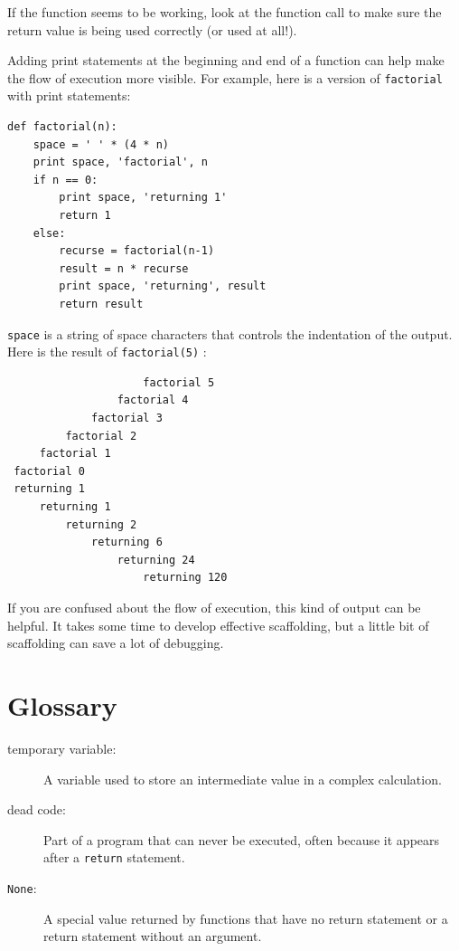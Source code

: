 \documentclass[10pt]{book}
\begin{document}
\begin{CJK}{UTF8}{gbsn}
If the function seems to be working, look at the function call
to make sure the return value is being used correctly (or used
at all!).

Adding print statements at the beginning and end of a function
can help make the flow of execution more visible.
For example, here is a version of {\tt factorial} with
print statements:

\begin{verbatim}
def factorial(n):
    space = ' ' * (4 * n)
    print space, 'factorial', n
    if n == 0:
        print space, 'returning 1'
        return 1
    else:
        recurse = factorial(n-1)
        result = n * recurse
        print space, 'returning', result
        return result
\end{verbatim}
%
{\tt space} is a string of space characters that controls the
indentation of the output.  Here is the result of {\tt factorial(5)} :

\begin{verbatim}
                     factorial 5
                 factorial 4
             factorial 3
         factorial 2
     factorial 1
 factorial 0
 returning 1
     returning 1
         returning 2
             returning 6
                 returning 24
                     returning 120
\end{verbatim}
%
If you are confused about the flow of execution, this kind of
output can be helpful.  It takes some time to develop effective
scaffolding, but a little bit of scaffolding can save a lot of debugging.


\section{Glossary}

\begin{description}

\item[temporary variable:]  A variable used to store an intermediate value in
a complex calculation.

\item[dead code:]  Part of a program that can never be executed, often because
it appears after a {\tt return} statement.

\item[{\tt None}:]  A special value returned by functions that
have no return statement or a return statement without an argument.


\end{description}
\end{CJK}
\end{document}
